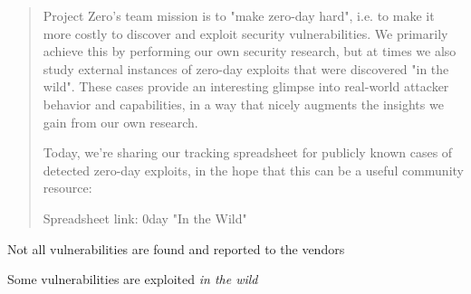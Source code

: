 \documentclass[Screen16to9,17pt]{foils}
\begin{document}

\begin{quote}

  Project Zero's team mission is to "make zero-day hard", i.e. to make it more costly to discover and exploit security vulnerabilities. We primarily achieve this by performing our own security research, but at times we also study external instances of zero-day exploits that were discovered "in the wild". These cases provide an interesting glimpse into real-world attacker behavior and capabilities, in a way that nicely augments the insights we gain from our own research.

  Today, we're sharing our tracking spreadsheet for publicly known cases of detected zero-day exploits, in the hope that this can be a useful community resource:

  Spreadsheet link: 0day "In the Wild"\\
\end{quote}

\begin{list2}
\item Not all vulnerabilities are found and reported to the vendors
\item Some vulnerabilities are exploited \emph{in the wild}
\end{list2}






\end{document}
